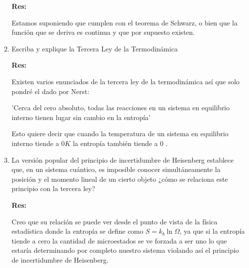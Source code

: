 \documentclass[12pt,a4paper]{article}
\begin{document}
\begin{enumerate}
\textbf{Res:}

Estamos suponiendo que cumplen con el teorema de Schwarz, o bien que la función que se deriva es continua y que por supuesto existen.








\item Escriba y explique la Tercera Ley de la Termodinámica

\textbf{Res:}

Existen varios enunciados de la tercera ley de la termodinámica así que solo pondré el dado por Nerst:

'Cerca del cero absoluto, todas las reacciones en un sistema en equilibrio interno tienen lugar sin cambio en la entropía'

Esto quiere decir que cuando la temperatura de un sistema en equilibrio interno tiende a $0 K$ la entropía también tiende a $0$ .










\item La versión popular del principio de incertidumbre de Heisenberg establece que, en un sistema cuántico, es imposible conocer simultáneamente la posición y el momento lineal de un cierto objeto ¿cómo se relaciona este principio con la tercera ley?

\textbf{Res:}

Creo que su relación se puede ver desde el punto de vista de la física estadística donde la entropía se define como $S = k_b \ln{\Omega}$, ya que si la entropía tiende a cero la cantidad de microestados se ve forzada a ser uno lo que estaría determinando por completo nuestro sistema violando así el principio de incertidumbre de Heisenberg.


    
    
\end{enumerate}
\end{document}

